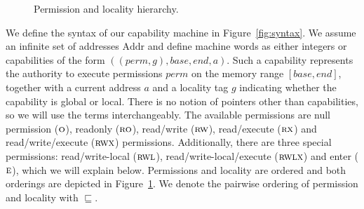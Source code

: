 \documentclass[format=acmsmall, review=false, screen=true]{acmart}
\renewcommand{\figurename}{Figure}
\newcommand{\var}[1]{\mathit{#1}}
\newcommand{\gl}{\var{g}}
\newcommand{\addr}{\var{a}}
\newcommand{\perm}{\var{perm}}
\newcommand{\plaindom}[1]{\mathrm{#1}}
\newcommand{\Addrs}{\plaindom{Addr}}
\newcommand{\plainperm}[1]{\textsc{#1}}
\newcommand{\noperm}{\plainperm{o}}
\newcommand{\readonly}{\plainperm{ro}}
\newcommand{\readwrite}{\plainperm{rw}}
\newcommand{\exec}{\plainperm{rx}}
\newcommand{\entry}{\plainperm{e}}
\newcommand{\rwx}{\plainperm{rwx}}
\newcommand{\readwritel}{\plainperm{rwl}}
\newcommand{\rwlx}{\plainperm{rwlx}}
\newcommand{\plainlocality}[1]{\mathrm{#1}}
\newcommand{\local}{\plainlocality{local}}
\newcommand{\glob}{\plainlocality{global}}
\newcommand{\itoplas}[1]
    {{\color{OliveGreen} #1}}
\begin{document}
\begin{figure}
  \centering
  \begin{tikzpicture}[main node/.style={}]
  \end{tikzpicture}
  \caption{Permission and locality hierarchy.}
  \label{fig:perm-hier}
\end{figure}

We define the syntax of our capability machine in \figurename~\ref{fig:syntax}.
We assume an infinite set of addresses $\Addrs$ and define machine words as
either integers or capabilities of the form
$((\perm,\gl),\var{base},\var{end},\addr)$. Such a capability represents the
authority to execute permissions $\perm$ on the memory range
$[\var{base},\var{end}]$, together with a current address $\addr$ and a locality tag
$\gl$ indicating whether the capability is global or local. There is no notion
of pointers other than capabilities, so we will use the terms interchangeably.
The available permissions are null permission
($\noperm$), readonly ($\readonly$), read/write ($\readwrite$), read/execute
($\exec$) and read/write/execute ($\rwx$) permissions. Additionally, there are
three special permissions: read/write-local ($\readwritel$), read/write-local/execute
($\rwlx$) and enter ($\entry$), which we will explain below.
\itoplas{Permissions and locality are ordered and both orderings are depicted in \figurename~\ref{fig:perm-hier}. We denote the pairwise ordering of permission and locality with $\sqsubseteq$.}
\end{document}
